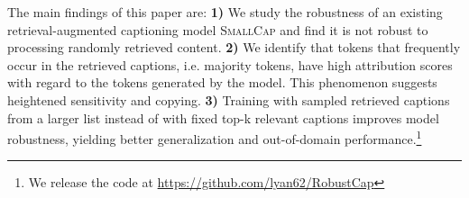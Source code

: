 The main findings of this paper are: \textbf{1)} We study the robustness of an existing retrieval-augmented captioning model \textsc{SmallCap} and find it is not robust to processing randomly retrieved content. \textbf{2)} We identify that tokens that frequently occur in the retrieved captions, i.e. majority tokens, have high attribution scores with regard to the tokens generated by the model. This phenomenon suggests heightened sensitivity and copying. \textbf{3)} Training with sampled retrieved captions from a larger list instead of with fixed top-k relevant captions improves model robustness, yielding better generalization and out-of-domain performance.\footnote{We release the code at \url{https://github.com/lyan62/RobustCap}} 




    

